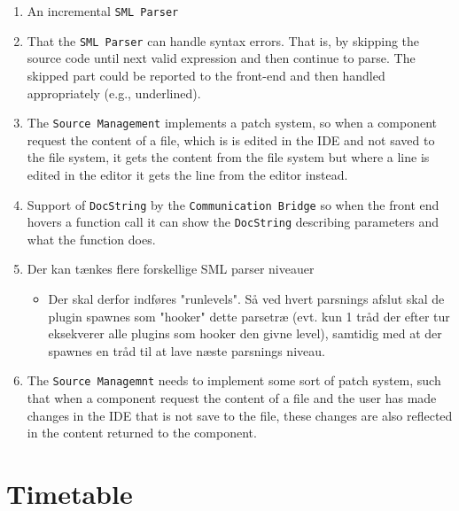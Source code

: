 \documentclass[a4paper,oneside]{memoir}
\begin{document}
\begin{enumerate}

\item An incremental \texttt{SML Parser}

\item That the \texttt{SML Parser} can handle syntax errors. That is,
  by skipping the source code until next valid expression and then
  continue to parse. The skipped part could be reported to the
  front-end and then handled appropriately (e.g., underlined).

\item The \texttt{Source Management} implements a patch system, so
  when a component request the content of a file, which is is edited
  in the IDE and not saved to the file system, it gets the content
  from the file system but where a line is edited in the editor it
  gets the line from the editor instead.


\item Support of \texttt{DocString} by the \texttt{Communication
    Bridge} so when the front end hovers a function call it can show
  the \texttt{DocString} describing parameters and what the function
  does.

\item Der kan tænkes flere forskellige SML parser niveauer
  \begin{itemize}
    
  \item Der skal derfor indføres "runlevels". Så ved hvert parsnings
    afslut skal de plugin spawnes som "hooker" dette parsetræ
    (evt. kun 1 tråd der efter tur eksekverer alle plugins som hooker
    den givne level), samtidig med at der spawnes en tråd til at lave
    næste parsnings niveau.
  \end{itemize}


\item The \texttt{Source Managemnt} needs to implement some sort of patch
  system, such that when a component request the content of a file and the user
  has made changes in the IDE that is not save to the file, these changes are
  also reflected in the content returned to the component.
  
\end{enumerate}


\appendix

\chapter{Timetable}
\end{document}
